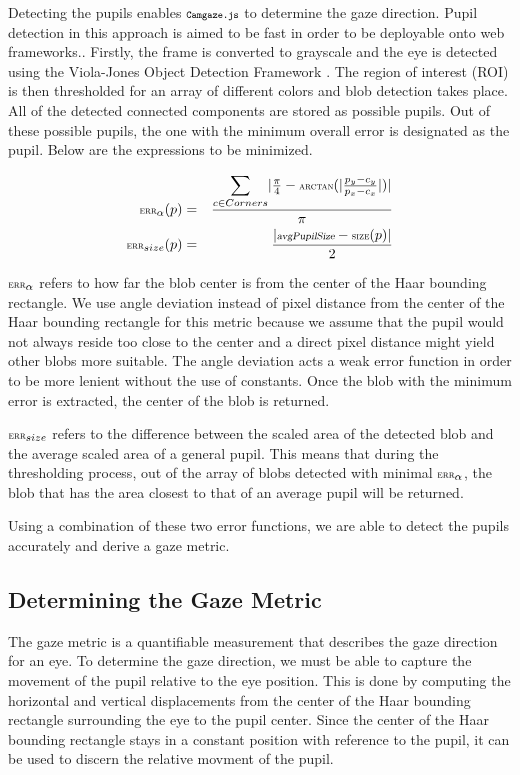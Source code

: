 \documentclass[annual]{acmsiggraph}
\newcommand{\Acronym}[1]{\ensuremath{{\small{\texttt{#1}}}}}
\newcommand{\Name}{\Acronym{Camgaze.js}} \newcommand{\False}{\Constant{false}}
\newcommand{\Function}[1]{\ensuremath{{\small \textsc{#1}}}}
\newcommand{\Constant}[1]{\ensuremath{\small{\texttt{#1}}}}
\newcommand{\Var}[1]{\ensuremath{{\small{\textsl{#1}}}}}
\begin{document}
Detecting the pupils enables $\Name$ to determine the gaze direction.
Pupil detection in this approach is aimed to be fast in order to be deployable
onto web frameworks.. Firstly, the frame is converted to grayscale and the eye
is detected using the Viola-Jones Object Detection Framework \cite{Viola01}.
The region of interest (ROI) is then thresholded for an array of different
colors and blob detection takes place. All of the detected connected components
are stored as possible pupils. Out of these possible pupils, the one with the
minimum overall error is designated as the pupil.  Below are the expressions to
be minimized.

\begin{eqnarray}
\Function{err}_{\alpha}(p) &=& \frac{
    \mathlarger{\sum}_{c \in Corners}{
        \vert
            \frac{\pi}{4} - \Function{arctan}(
                \vert \frac{p_y - c_y}{p_x - c_x} \vert
            )
        \vert
    } }{\pi} \\ \Function{err}_{size}(p) &=& \frac{ \vert \Var{avgPupilSize} -
    \Function{size}(p) \vert }{2} \end{eqnarray}

$\Function{err}_{\alpha}$ refers to how far the blob center is from the
center of the Haar bounding rectangle. We use angle deviation instead of pixel
distance from the center of the Haar bounding rectangle for this metric because
we assume that the pupil would not always reside too close to the center and a
direct pixel distance might yield other blobs more suitable. The angle
deviation acts a weak error function in order to be more lenient without the
use of constants.  Once the blob with the minimum error is extracted, the
center of the blob is returned.

$\Function{err}_{size}$ refers to the difference between the scaled area of the
detected blob and the average scaled area of a general pupil. This means that
during the thresholding process, out of the  array of blobs detected with
minimal $\Function{err}_{\alpha}$, the blob that has the area closest to that
of an average pupil will be returned.

Using a combination of these two error functions, we are able to detect the
pupils accurately and derive a gaze metric.

\subsection{Determining the Gaze Metric}

The gaze metric is a quantifiable measurement that describes the gaze direction
for an eye. To determine the gaze direction, we must be able to capture the
movement of the pupil relative to the eye position. This is done by computing
the horizontal and vertical displacements from the center of the Haar bounding
rectangle surrounding the eye to the pupil center. Since the center of the Haar
bounding rectangle stays in a constant position with reference to the pupil, it
can be used to discern the relative movment of the pupil.
\end{document}
